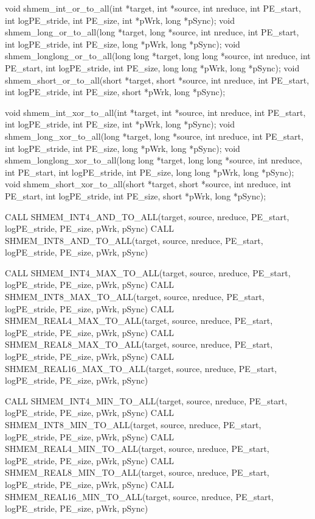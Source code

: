 void shmem_int_or_to_all(int *target, int *source, int nreduce, int PE_start, int logPE_stride, int PE_size, int *pWrk, long *pSync);
void	shmem_long_or_to_all(long *target, long *source, int nreduce, int PE_start, int logPE_stride, int PE_size, long *pWrk, long *pSync);
void	shmem_longlong_or_to_all(long long *target, long long *source, int nreduce, int PE_start, int logPE_stride, int PE_size, long long *pWrk, long *pSync);
void	 shmem_short_or_to_all(short *target, short *source, int nreduce, int PE_start, int logPE_stride, int PE_size, short *pWrk, long *pSync);


void shmem_int_xor_to_all(int *target, int *source, int nreduce, int PE_start, int logPE_stride, int PE_size, int *pWrk, long *pSync);
void	shmem_long_xor_to_all(long *target, long *source, int nreduce, int PE_start, int logPE_stride, int PE_size, long *pWrk, long *pSync);
void shmem_longlong_xor_to_all(long long *target, long long *source, int nreduce, int PE_start, int logPE_stride, int PE_size, long long *pWrk, long *pSync);
void shmem_short_xor_to_all(short	*target, short *source, int nreduce, int PE_start, int logPE_stride, int PE_size, short *pWrk, long *pSync);

\synF %


CALL SHMEM_INT4_AND_TO_ALL(target, source, nreduce, PE_start, logPE_stride, PE_size, pWrk, pSync)
CALL SHMEM_INT8_AND_TO_ALL(target, source, nreduce, PE_start, logPE_stride, PE_size, pWrk, pSync)

CALL SHMEM_INT4_MAX_TO_ALL(target, source, nreduce, PE_start, logPE_stride, PE_size, pWrk, pSync)
CALL SHMEM_INT8_MAX_TO_ALL(target, source,	 nreduce, PE_start, logPE_stride, PE_size, pWrk, pSync)
CALL SHMEM_REAL4_MAX_TO_ALL(target, source, nreduce, PE_start, logPE_stride, PE_size, pWrk, pSync)
CALL SHMEM_REAL8_MAX_TO_ALL(target,	source, nreduce, PE_start, logPE_stride, PE_size, pWrk, pSync)
CALL SHMEM_REAL16_MAX_TO_ALL(target, source, nreduce, PE_start, logPE_stride, PE_size, pWrk, pSync)


CALL SHMEM_INT4_MIN_TO_ALL(target, source, nreduce, PE_start, logPE_stride, PE_size, pWrk, pSync)
CALL SHMEM_INT8_MIN_TO_ALL(target, source, nreduce, PE_start, logPE_stride, PE_size, pWrk, pSync)
CALL SHMEM_REAL4_MIN_TO_ALL(target, source, nreduce, PE_start, logPE_stride, PE_size, pWrk, pSync)
CALL SHMEM_REAL8_MIN_TO_ALL(target, source, nreduce, PE_start, logPE_stride, PE_size, pWrk, pSync)
CALL SHMEM_REAL16_MIN_TO_ALL(target, source, nreduce, PE_start, logPE_stride, PE_size, pWrk, pSync)


